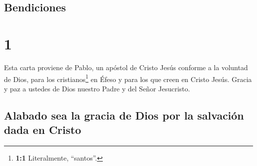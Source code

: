 \hypertarget{bendiciones}{%
\subsection{Bendiciones}\label{bendiciones}}

\hypertarget{section}{%
\section{1}\label{section}}

 Esta carta proviene de Pablo, un apóstol de Cristo Jesús
conforme a la voluntad de Dios, para los cristianos\footnote{\textbf{1:1}
  Literalmente, ``santos''.} en Éfeso y para los que creen en Cristo
Jesús.  Gracia y paz a ustedes de Dios nuestro Padre y del
Señor Jesucristo.

\hypertarget{alabado-sea-la-gracia-de-dios-por-la-salvaciuxf3n-dada-en-cristo}{%
\subsection{Alabado sea la gracia de Dios por la salvación dada en
Cristo}\label{alabado-sea-la-gracia-de-dios-por-la-salvaciuxf3n-dada-en-cristo}}

